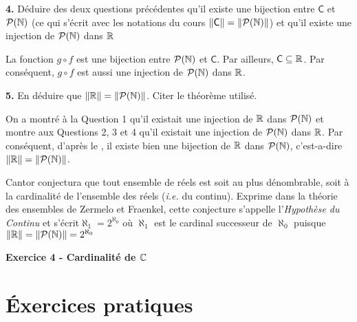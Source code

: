     \hspace*{-1.5em}\textbf{4.} Déduire des deux questions précédentes qu'il existe une bijection entre \(\mathsf{C}\) et \(\mathcal{P}(\mathbb{N})\) (ce qui s'écrit avec les notations du cours \(\|\mathsf{C}\|=\|\mathcal{P}(\mathbb{N})\|\)) et qu'il existe une injection de \(\mathcal{P}(\mathbb{N})\) dans \(\mathbb{R}\)\par
    \headrule
    La fonction \(g\circ f\) est une bijection entre \(\mathcal{P}(\mathbb{N})\) et \(\mathsf{C}\). Par ailleurs, \(\mathsf{C}\subseteq\mathbb{R}\). Par conséquent, \(g\circ f\) est aussi une injection de \(\mathcal{P}(\mathbb{N})\) dans \(\mathbb{R}\).\par

    \hspace*{-1.5em}\textbf{5.} En déduire que \(\|\mathbb{R}\|=\|\mathcal{P}(\mathbb{N})\|\). Citer le théorème utilisé.\par
    \headrule
    On a montré à la Question 1 qu'il existait une injection de \(\mathbb{R}\) dans \(\mathcal{P}(\mathbb{N})\) et montre aux Questions 2, 3 et 4 qu'il existait une injection de \(\mathcal{P}(\mathbb{N})\) dans \(\mathbb{R}\). Par conséquent, d'après le , il existe bien une bijection de \(\mathbb{R}\) dans \(\mathcal{P}(\mathbb{N})\), c'est-a-dire \(\|\mathbb{R}\|=\|\mathcal{P}(\mathbb{N})\|\).\par

    Cantor conjectura que tout ensemble de réels est soit au plus dénombrable, soit à la cardinalité de l'ensemble des réels (\emph{i.e.} du continu). Exprime dans la théorie des ensembles de Zermelo et Fraenkel, cette conjecture s'appelle l'\emph{Hypothèse du Continu} et s'écrit\(\aleph_1=2^{\aleph_0}\) o\`u \(\aleph_1\) est le cardinal successeur de \(\aleph_0\) puisque \(\|\mathbb{R}\|=\|\mathcal{P}(\mathbb{N})\|=2^{\aleph_0}\)\par

    \hspace*{-2.65cm}\textbf{Exercice 4 - Cardinalité de \(\mathbb{C}\)}\\

    
    \section{\'Exercices pratiques}\label{sec:etudes_cas}